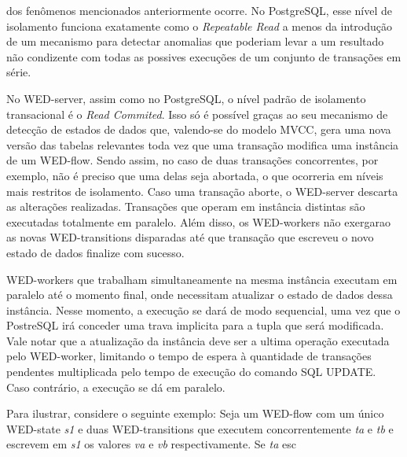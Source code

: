 \documentclass[conference]{IEEEtran}
\begin{document}
dos fenômenos mencionados anteriormente ocorre. No PostgreSQL, esse nível de isolamento funciona exatamente como o \emph{Repeatable Read}
a menos da introdução de um mecanismo para detectar anomalias que poderiam levar a um resultado não condizente com todas
as possives execuções de um conjunto de transações em série.
\par No WED-server, assim como no PostgreSQL, o nível padrão de isolamento transacional é o \emph{Read Commited}. Isso só
é possível graças ao seu mecanismo de detecção de estados de dados que, valendo-se do modelo MVCC, gera uma nova versão das
tabelas relevantes toda vez que uma transação modifica uma instância de um WED-flow. Sendo assim, no caso de duas transações 
concorrentes, por exemplo, não é preciso que uma delas seja abortada, o que ocorreria em níveis mais restritos de isolamento.
Caso uma transação aborte, o WED-server descarta as alterações realizadas. Transações que operam em instância distintas 
são executadas totalmente em paralelo. Além disso, os WED-workers não exergarao as novas WED-transitions 
disparadas até que transação que escreveu o novo estado de dados finalize com sucesso.
\par WED-workers que trabalham simultaneamente na mesma instância executam em paralelo até o momento final, onde necessitam
atualizar o estado de dados dessa instância. Nesse momento, a execução se dará de modo sequencial, uma vez que o PostreSQL
irá conceder uma trava implicita para a tupla que será modificada. Vale notar que a atualização da instância deve ser a 
ultima operação executada pelo WED-worker, limitando o tempo de espera à quantidade de transações pendentes multiplicada 
pelo tempo de execução do comando SQL UPDATE. Caso contrário, a execução se dá em paralelo.
   




Para ilustrar, considere o seguinte exemplo: Seja um
WED-flow com um único WED-state \emph{s1} e duas WED-transitions que executem concorrentemente \emph{ta} e \emph{tb} e 
escrevem em \emph{s1} os valores \emph{va} e \emph{vb} respectivamente. Se \emph{ta} esc

\end{document}
